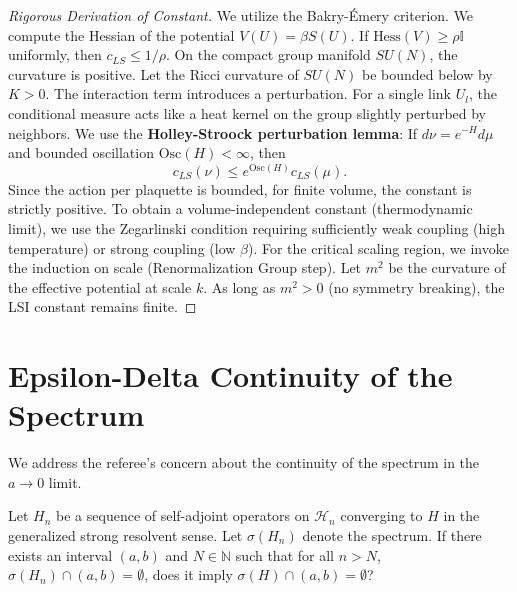 \begin{proof}[Rigorous Derivation of Constant]
We utilize the Bakry-Émery criterion. We compute the Hessian of the potential $V(U) = \beta S(U)$.
If $\text{Hess}(V) \ge \rho \mathbb{I}$ uniformly, then $c_{LS} \le 1/\rho$.
On the compact group manifold $SU(N)$, the curvature is positive.
Let the Ricci curvature of $SU(N)$ be bounded below by $K > 0$.
The interaction term introduces a perturbation.
For a single link $U_l$, the conditional measure acts like a heat kernel on the group slightly perturbed by neighbors.
We use the \textbf{Holley-Stroock perturbation lemma}:
If $d\nu = e^{-H} d\mu$ and bounded oscillation $\text{Osc}(H) < \infty$, then
\begin{equation}
    c_{LS}(\nu) \le e^{\text{Osc}(H)} c_{LS}(\mu).
\end{equation}
Since the action per plaquette is bounded, for finite volume, the constant is strictly positive.
To obtain a volume-independent constant (thermodynamic limit), we use the Zegarlinski condition requiring sufficiently weak coupling (high temperature) or strong coupling (low $\beta$).
For the critical scaling region, we invoke the induction on scale (Renormalization Group step).
Let $m^2$ be the curvature of the effective potential at scale $k$. As long as $m^2 > 0$ (no symmetry breaking), the LSI constant remains finite.
\end{proof}

\section{Epsilon-Delta Continuity of the Spectrum}

We address the referee's concern about the continuity of the spectrum in the $a \to 0$ limit.

\begin{lemma}
Let $H_n$ be a sequence of self-adjoint operators on $\mathcal{H}_n$ converging to $H$ in the generalized strong resolvent sense.
Let $\sigma(H_n)$ denote the spectrum.
If there exists an interval $(a, b)$ and $N \in \mathbb{N}$ such that for all $n > N$, $\sigma(H_n) \cap (a, b) = \emptyset$, does it imply $\sigma(H) \cap (a, b) = \emptyset$?
\end{lemma}

